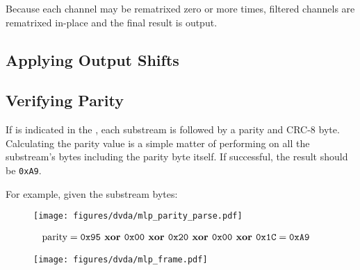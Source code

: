Because each channel may be rematrixed zero or more times,
filtered channels are rematrixed in-place
and the final result is output.


\clearpage

\subsection{Applying Output Shifts}
\label{mlp:output_shifts}


\clearpage

\subsection{Verifying Parity}
\label{mlp:verify_parity}
If  is indicated in the ,
each substream is followed by a parity and CRC-8 byte.
Calculating the parity value is a simple matter of performing
\xor on all the substream's bytes including the parity byte itself.
If successful, the result should be \texttt{0xA9}.
\par
For example, given the substream bytes:
\begin{figure}[h]
  \texttt{[image: figures/dvda/mlp\_parity\_parse.pdf]}
\end{figure}
\begin{align*}
  \text{parity} &= \texttt{0x95} \textbf{ xor } \texttt{0x00} \textbf{ xor } \texttt{0x20} \textbf{ xor } \texttt{0x00} \textbf{ xor } \texttt{0x1C} = \texttt{0xA9}
\end{align*}

\begin{figure}[h]
  \texttt{[image: figures/dvda/mlp\_frame.pdf]}
\end{figure}

\clearpage

